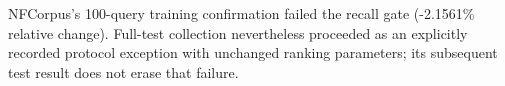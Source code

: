 NFCorpus's 100-query training confirmation failed the recall gate (-2.1561\% relative change). Full-test collection nevertheless proceeded as an explicitly recorded protocol exception with unchanged ranking parameters; its subsequent test result does not erase that failure.
